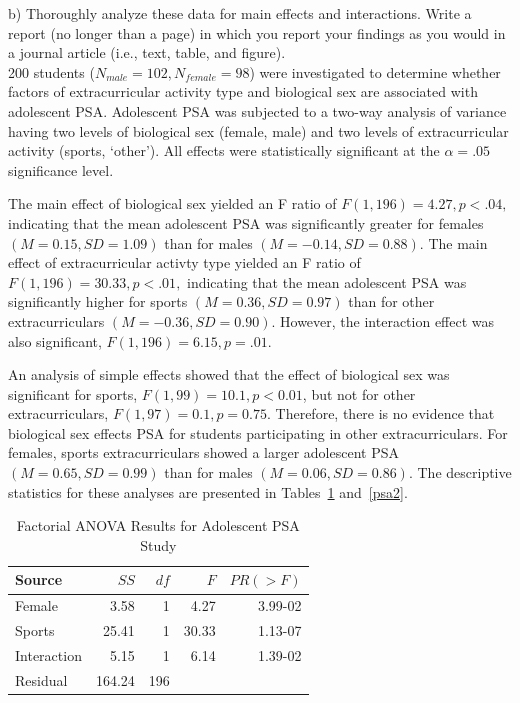 \documentclass[onecolumn,10pt]{jhwhw}
\begin{document}
b) Thoroughly analyze these data for main effects and interactions. Write a report (no longer than a page) in which you report your findings as you would in a journal article (i.e., text, table, and figure).\\

200 students ($N_{male}=102, N_{female}=98$) were investigated to determine whether factors of extracurricular activity type and biological sex are associated with adolescent PSA. Adolescent PSA was subjected to a two-way analysis of variance having two levels of biological sex (female, male) and two levels of extracurricular activity (sports, `other'). All effects were statistically significant at the $\alpha=.05$ significance level.

The main effect of biological sex yielded an F ratio of $F(1, 196) = 4.27, p < .04,$ indicating that the mean adolescent PSA was significantly greater for females $(M = 0.15, SD = 1.09)$ than for males $(M = -0.14, SD = 0.88)$. The main effect of extracurricular activty type yielded an F ratio of $F(1, 196) = 30.33, p < .01,$ indicating that the mean adolescent PSA was significantly higher for sports $(M = 0.36, SD = 0.97)$ than for other extracurriculars $(M = -0.36, SD = 0.90)$. However, the interaction effect was also significant, $F(1, 196) = 6.15, p = .01$.

An analysis of simple effects showed that the effect of biological sex was significant for sports, $F(1, 99) = 10.1, p < 0.01$, but not for other extracurriculars, $F(1, 97) = 0.1, p = 0.75$. Therefore, there is no evidence that biological sex effects PSA for students participating in other extracurriculars. For females, sports extracurriculars showed a larger adolescent PSA $(M=0.65, SD=0.99)$ than for males $(M=0.06, SD=0.86)$. The descriptive statistics for these analyses are presented in Tables~\ref{psa1} and~\ref{psa2}. \\

\begin{table}[h!]
\begin{center}
\begin{tabular}{lrrrr}
\toprule
Source        &   $SS$ & $df$ &  $F$ &       $PR(>F)$ \\
\midrule
Female        &   3.58 &   1 &  4.27 &      3.99-02 \\
Sports        &  25.41 &   1 & 30.33 &      1.13-07 \\
Interaction   &   5.15 &   1 &  6.14 &      1.39-02 \\
Residual      & 164.24 & 196 &       &           \\
\bottomrule
\end{tabular}
\end{center}
\caption{Factorial ANOVA Results for Adolescent PSA Study}
\label{psa1}
\end{table}
\end{document}
